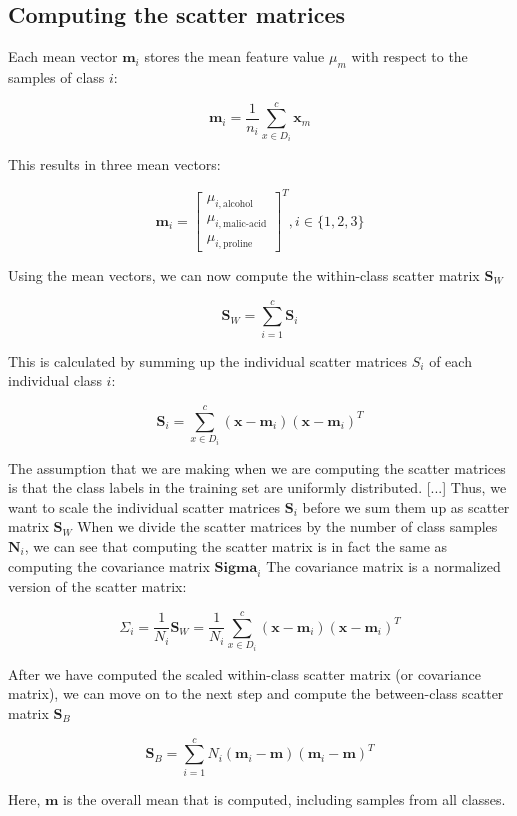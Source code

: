 \documentclass[letterpaper]{report}
\begin{document}
\subsection{Computing the scatter matrices}

Each mean vector $\mathbf{m}_i$ stores the mean feature value $\mu_m$ with respect to the samples of class $i$:

\[
\mathbf{m}_i = \frac{1}{n_i} \sum_{x \in D_i}^{c} \mathbf{x}_m
\]

This results in three mean vectors:

\[
\mathbf{m}_i = \begin{bmatrix} 
\mu_{i, \text{alcohol}} \\
\mu_{i, \text{malic-acid}} \\
\mu_{i, \text{proline}} 
 \end{bmatrix}^T, i  \in   \{ 1, 2, 3 \}
\]

Using the mean vectors, we can now compute the within-class scatter matrix $\mathbf{S}_W$

\[
\mathbf{S}_W = \sum^{c}_{i=1} \mathbf{S}_i
\]

This is calculated by summing up the individual scatter matrices $S_i$ of each
individual class $i$:

\[
\mathbf{S}_i = \sum_{x \in D_i}^{c} (\mathbf{x} - \mathbf{m}_i) (\mathbf{x} - \mathbf{m}_i)^T
\]

The assumption that we are making when we are computing the scatter matrices is that the class labels in the training set are uniformly distributed. [...] Thus, we want to scale the individual scatter matrices $\mathbf{S}_i$ before we sum them up as scatter matrix $\mathbf{S}_W$ When we divide the scatter matrices by the number of class samples $\mathbf{N}_i$, we can see that computing the scatter matrix is in fact the same as computing the covariance matrix $\mathbf{Sigma}_i$ The covariance matrix is a normalized version of the scatter matrix:

\[
\Sigma_i = \frac{1}{N_i} \mathbf{S}_W = \frac{1}{N_i} \sum^{c}_{x \in D_i}  (\mathbf{x} - \mathbf{m}_i) (\mathbf{x} - \mathbf{m}_i)^T
\]

After we have computed the scaled within-class scatter matrix (or covariance matrix), we can move on to the next step and compute the between-class scatter matrix $\mathbf{S}_B$

\[
\mathbf{S}_B = \sum^{c}_{i=1} N_i (\mathbf{m}_i - \mathbf{m})(\mathbf{m}_i - \mathbf{m})^T
\]

Here, $\mathbf{m}$ is the overall mean that is computed, including samples from all classes.
\end{document}
